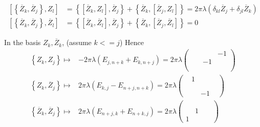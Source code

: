\documentclass[12pt]{amsart}
\def\barZ{{\overline{Z}}}
\def\cmm#1#2{\left[{#1},{#2}\right]}
\def\acmm#1#2{\left\{{#1},{#2}\right\}}
\begin{document}
\begin{align*}
 \cmm{\acmm{\barZ_k}{\barZ_j}}{Z_l} &= \acmm{\cmm{\barZ_k}{Z_l}}{\barZ_j} 
+ \acmm{\barZ_k}{\cmm{\barZ_j}{Z_l}} 
= 2\pi \lambda (\delta_{kl} \barZ_j+ \delta_{jl}\barZ_k)\\
 \cmm{\acmm{\barZ_k}{\barZ_j}}{\barZ_l} 
&= \acmm{\cmm{\barZ_k}{\barZ_l}}{\barZ_j} 
+ \acmm{\barZ_k}{\cmm{\barZ_j}{\barZ_l}} 
= 0
\end{align*}

In the basis $Z_k, \barZ_k$, (assume $k<=j$)
Hence 
\begin{align}\label{eq:matZ}
\acmm{Z_k}{Z_j} \mapsto& -2\pi \lambda (E_{j,n+k}+E_{k,n+j}) = 2\pi\lambda
\begin{pmatrix}
 & & & -1\\
 & &-1 & \\
 & &  & \\
 & &  &  
\end{pmatrix}
\\
\acmm{Z_k}{\barZ_j} \mapsto& 2\pi\lambda (E_{k,j}-E_{n+j,n+k}) 
= 2\pi\lambda
\begin{pmatrix}
 &1 &  & \\
 & &  & \\
 & &  & \\
 & &-1  &  
\end{pmatrix}
\\
\acmm{\barZ_k}{\barZ_j} \mapsto & 2\pi\lambda (E_{n+j,k} + E_{n+k,j}) 
= 2\pi\lambda
\begin{pmatrix}
 & &  & \\
 & &  & \\
 & 1&  & \\
 1& &  &  
\end{pmatrix}
\end{align}
\end{document}
